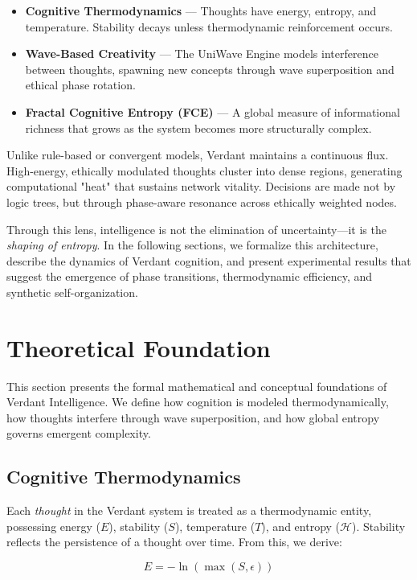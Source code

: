 \documentclass{article}
\begin{document}
\begin{itemize}
    \item \textbf{Cognitive Thermodynamics} — Thoughts have energy, entropy, and temperature. Stability decays unless thermodynamic reinforcement occurs.
    \item \textbf{Wave-Based Creativity} — The UniWave Engine models interference between thoughts, spawning new concepts through wave superposition and ethical phase rotation.
    \item \textbf{Fractal Cognitive Entropy (FCE)} — A global measure of informational richness that grows as the system becomes more structurally complex.
\end{itemize}

Unlike rule-based or convergent models, Verdant maintains a continuous flux. High-energy, ethically modulated thoughts cluster into dense regions, generating computational "heat" that sustains network vitality. Decisions are made not by logic trees, but through phase-aware resonance across ethically weighted nodes.

Through this lens, intelligence is not the elimination of uncertainty—it is the \emph{shaping of entropy}. In the following sections, we formalize this architecture, describe the dynamics of Verdant cognition, and present experimental results that suggest the emergence of phase transitions, thermodynamic efficiency, and synthetic self-organization.


\section{Theoretical Foundation}

This section presents the formal mathematical and conceptual foundations of Verdant Intelligence. We define how cognition is modeled thermodynamically, how thoughts interfere through wave superposition, and how global entropy governs emergent complexity.

\subsection{Cognitive Thermodynamics}

Each \textit{thought} in the Verdant system is treated as a thermodynamic entity, possessing energy ($E$), stability ($S$), temperature ($T$), and entropy ($\mathcal{H}$). Stability reflects the persistence of a thought over time. From this, we derive:

\begin{equation}
E = -\ln \left( \max(S, \epsilon) \right)
\end{equation}
\end{document}
